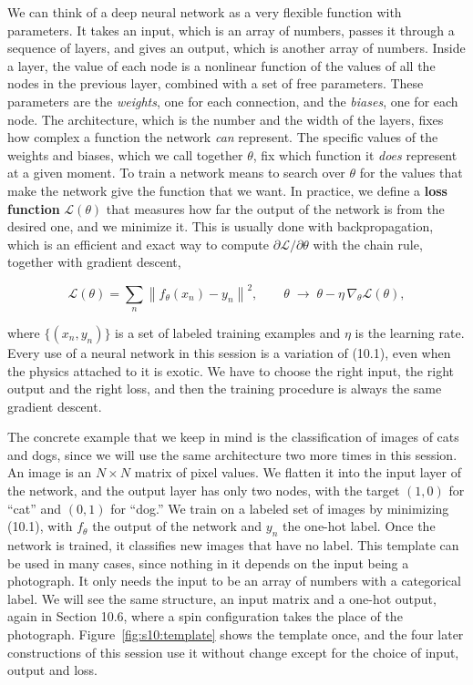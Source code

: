 We can think of a deep neural network as a very flexible function with parameters. It takes an
input, which is an array of numbers, passes it through a sequence of layers, and gives an output,
which is another array of numbers. Inside a layer, the value of each node is a nonlinear function
of the values of all the nodes in the previous layer, combined with a set of free parameters. These
parameters are the \emph{weights}, one for each connection, and the \emph{biases}, one for each
node. The architecture, which is the number and the width of the layers, fixes how complex a
function the network \emph{can} represent. The specific values of the weights and biases, which we
call together $\theta$, fix which function it \emph{does} represent at a given moment. To train a
network means to search over $\theta$ for the values that make the network give the function that
we want. In practice, we define a \textbf{loss function} $\mathcal{L}(\theta)$ that measures how
far the output of the network is from the desired one, and we minimize it. This is usually done
with backpropagation, which is an efficient and exact way to compute $\partial
\mathcal{L}/\partial\theta$ with the chain rule, together with gradient descent,

\begin{equation}
\mathcal{L}(\theta) = \sum_n \left\| f_\theta(x_n) - y_n \right\|^2, \qquad \theta \;\longrightarrow\; \theta - \eta\, \nabla_\theta \mathcal{L}(\theta),
\end{equation}

where $\{(x_n, y_n)\}$ is a set of labeled training examples and $\eta$ is the learning rate. Every
use of a neural network in this session is a variation of (10.1), even when the physics attached to
it is exotic. We have to choose the right input, the right output and the right loss, and then the
training procedure is always the same gradient descent.

The concrete example that we keep in mind is the classification of images of cats and dogs, since
we will use the same architecture two more times in this session. An image is an $N\times N$
matrix of pixel values. We flatten it into the input layer of the network, and the output layer has
only two nodes, with the target $(1,0)$ for ``cat'' and $(0,1)$ for ``dog.'' We train on a labeled
set of images by minimizing (10.1), with $f_\theta$ the output of the network and $y_n$ the one-hot
label. Once the network is trained, it classifies new images that have no label. This template can
be used in many cases, since nothing in it depends on the input being a photograph. It only needs
the input to be an array of numbers with a categorical label. We will see the same structure, an
input matrix and a one-hot output, again in Section 10.6, where a spin configuration takes the place
of the photograph. Figure~\ref{fig:s10:template} shows the template once, and the four later
constructions of this session use it without change except for the choice of input, output and
loss.

